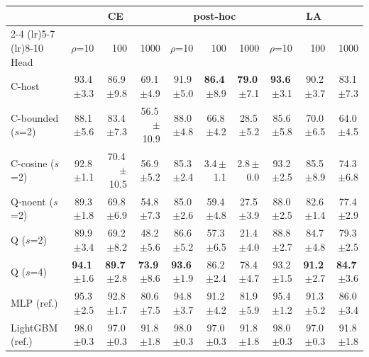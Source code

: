 \begin{tabular}{lrrrrrrrrr}
\toprule
 & \multicolumn{3}{c}{CE} & \multicolumn{3}{c}{post-hoc} & \multicolumn{3}{c}{LA} \\
\cmidrule(lr){2-4} \cmidrule(lr){5-7} \cmidrule(lr){8-10}
Head & $\rho$=10 & 100 & 1000 & $\rho$=10 & 100 & 1000 & $\rho$=10 & 100 & 1000 \\
\midrule
C-host & 93.4\,{\scriptsize$\pm$3.3} & 86.9\,{\scriptsize$\pm$9.8} & 69.1\,{\scriptsize$\pm$4.9} & 91.9\,{\scriptsize$\pm$5.0} & \textbf{86.4}\,{\scriptsize$\pm$8.9} & \textbf{79.0}\,{\scriptsize$\pm$7.1} & \textbf{93.6}\,{\scriptsize$\pm$3.1} & 90.2\,{\scriptsize$\pm$3.7} & 83.1\,{\scriptsize$\pm$7.3} \\
C-bounded ($s$=2) & 88.1\,{\scriptsize$\pm$5.6} & 83.4\,{\scriptsize$\pm$7.3} & 56.5\,{\scriptsize$\pm$10.9} & 88.0\,{\scriptsize$\pm$4.8} & 66.8\,{\scriptsize$\pm$4.2} & 28.5\,{\scriptsize$\pm$5.2} & 85.6\,{\scriptsize$\pm$5.8} & 70.0\,{\scriptsize$\pm$6.5} & 64.0\,{\scriptsize$\pm$4.5} \\
C-cosine ($s$=2) & 92.8\,{\scriptsize$\pm$1.1} & 70.4\,{\scriptsize$\pm$10.5} & 56.9\,{\scriptsize$\pm$5.2} & 85.3\,{\scriptsize$\pm$2.4} & 3.4\,{\scriptsize$\pm$1.1} & 2.8\,{\scriptsize$\pm$0.0} & 93.2\,{\scriptsize$\pm$2.5} & 85.5\,{\scriptsize$\pm$8.9} & 74.3\,{\scriptsize$\pm$6.8} \\
Q-noent ($s$=2) & 89.3\,{\scriptsize$\pm$1.8} & 69.8\,{\scriptsize$\pm$6.9} & 54.8\,{\scriptsize$\pm$7.3} & 85.0\,{\scriptsize$\pm$2.6} & 59.4\,{\scriptsize$\pm$4.8} & 27.5\,{\scriptsize$\pm$3.9} & 88.0\,{\scriptsize$\pm$2.5} & 82.6\,{\scriptsize$\pm$1.4} & 77.4\,{\scriptsize$\pm$2.9} \\
Q ($s$=2) & 89.9\,{\scriptsize$\pm$3.4} & 69.2\,{\scriptsize$\pm$8.2} & 48.2\,{\scriptsize$\pm$5.6} & 86.6\,{\scriptsize$\pm$5.2} & 57.3\,{\scriptsize$\pm$6.5} & 21.4\,{\scriptsize$\pm$4.0} & 88.8\,{\scriptsize$\pm$2.7} & 84.7\,{\scriptsize$\pm$4.8} & 79.3\,{\scriptsize$\pm$2.5} \\
Q ($s$=4) & \textbf{94.1}\,{\scriptsize$\pm$1.6} & \textbf{89.7}\,{\scriptsize$\pm$2.8} & \textbf{73.9}\,{\scriptsize$\pm$8.6} & \textbf{93.6}\,{\scriptsize$\pm$1.9} & 86.2\,{\scriptsize$\pm$2.4} & 78.4\,{\scriptsize$\pm$4.7} & 93.2\,{\scriptsize$\pm$1.5} & \textbf{91.2}\,{\scriptsize$\pm$2.7} & \textbf{84.7}\,{\scriptsize$\pm$3.6} \\
\midrule
MLP (ref.) & 95.3\,{\scriptsize$\pm$2.5} & 92.8\,{\scriptsize$\pm$1.7} & 80.6\,{\scriptsize$\pm$7.5} & 94.8\,{\scriptsize$\pm$3.7} & 91.2\,{\scriptsize$\pm$4.2} & 81.9\,{\scriptsize$\pm$5.9} & 95.4\,{\scriptsize$\pm$1.2} & 91.3\,{\scriptsize$\pm$5.2} & 86.0\,{\scriptsize$\pm$3.4} \\
LightGBM (ref.) & 98.0\,{\scriptsize$\pm$0.3} & 97.0\,{\scriptsize$\pm$0.3} & 91.8\,{\scriptsize$\pm$1.8} & 98.0\,{\scriptsize$\pm$0.3} & 97.0\,{\scriptsize$\pm$0.3} & 91.8\,{\scriptsize$\pm$1.8} & 98.0\,{\scriptsize$\pm$0.3} & 97.0\,{\scriptsize$\pm$0.3} & 91.8\,{\scriptsize$\pm$1.8} \\
\bottomrule
\end{tabular}